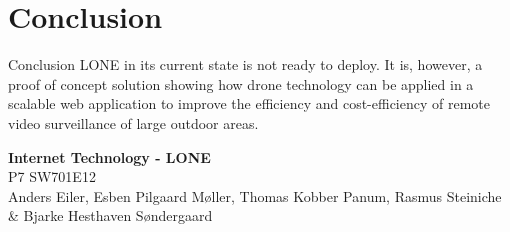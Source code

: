 \section{Conclusion}
\begin{frame}{Conclusion}
LONE in its current state is not ready to deploy. It is, however, a proof of concept solution showing how drone technology can be applied in a scalable web application to improve the efficiency and cost-efficiency of remote video surveillance of large outdoor areas.
\end{frame}


\begin{frame}{}
	\begin{center}
		\huge \textbf{Internet Technology - LONE}\\
		\normalsize P7 SW701E12\\
		\tiny{Anders Eiler, Esben Pilgaard Møller, Thomas Kobber Panum,}
		\tiny{Rasmus Steiniche \& Bjarke Hesthaven Søndergaard}
	\end{center}
\end{frame}